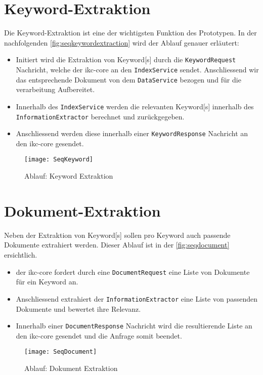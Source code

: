 \section{Keyword-Extraktion}
Die \gls{Keyword}-Extraktion ist eine der wichtigsten Funktion des Prototypen. In der nachfolgenden \autoref{fig:seqkeywordextraction} wird der Ablauf genauer erläutert:
\begin{itemize}
    \item Initiert wird die Extraktion von \gls{Keyword}[s] durch die \texttt{KeywordRequest} Nachricht, welche der \gls{ikc-core} an den \texttt{IndexService} sendet. Anschliessend wir das entsprechende Dokument von dem \texttt{DataService} bezogen und für die verarbeitung Aufbereitet. 
    \item Innerhalb des \texttt{IndexService} werden die relevanten \gls{Keyword}[s] innerhalb des \texttt{InformationExtractor} berechnet und zurückgegeben. 
    \item Anschliessend werden diese innerhalb einer \texttt{KeywordResponse} Nachricht an den \gls{ikc-core} gesendet.
\end{itemize}

    \begin{figure}[H]
    \centering
    \texttt{[image: SeqKeyword]}
    \caption{Ablauf: \gls{Keyword} Extraktion}
    \label{fig:seqkeywordextraction}
    \end{figure}

\section{Dokument-Extraktion}
Neben der Extraktion von \gls{Keyword}[s] sollen pro \gls{Keyword} auch passende Dokumente extrahiert werden. Dieser Ablauf ist in der \autoref{fig:seqdocument} ersichtlich.
\begin{itemize}
    \item der \gls{ikc-core} fordert durch eine \texttt{DocumentRequest} eine Liste von Dokumente für ein \gls{Keyword} an. 
    \item Anschliessend extrahiert der \texttt{InformationExtractor} eine Liste von passenden Dokumente und bewertet ihre Relevanz. 
    \item Innerhalb einer \texttt{DocumentResponse} Nachricht wird die resultierende Liste an den \gls{ikc-core} gesendet und die Anfrage somit beendet.
\end{itemize}

    \begin{figure}[H]
    \centering
    \texttt{[image: SeqDocument]}
    \caption{Ablauf: Dokument Extraktion}
    \label{fig:seqdocument}
    \end{figure}


